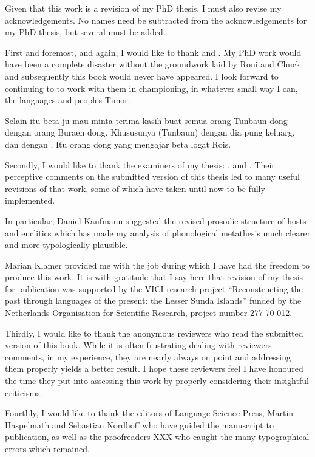 \begin{refsection}

Given that this work is a revision of my PhD thesis,
I must also revise my acknowledgements.
No names need be subtracted from the acknowledgements for my PhD thesis,
but several must be added.

First and foremost, and again, I would like to thank
 and .
My PhD work would have been a complete disaster without
the groundwork laid by Roni and Chuck and subsequently this book would never have appeared.
I look forward to continuing to to work with them in championing,
in whatever small way I can, the languages and peoples Timor.

Selain itu beta ju mau minta terima kasih buat semua
orang Tunbaun dong dengan orang Buraen dong.
Khususunya  (Tunbaun) dengan dia pung keluarg,
dan  dengan .
Itu orang dong yang mengajar beta logat Ro{\Q}is.

Secondly, I would like to thank the examiners of my thesis:
,  and .
Their perceptive comments on the submitted version of this thesis
led to many useful revisions of that work, some of which have
taken until now to be fully implemented.

In particular, Daniel Kaufmann suggested
the revised prosodic structure of hosts and enclitics which
has made my analysis of phonological metathesis much clearer
and more typologically plausible.

Marian Klamer provided me with the job during
which I have had the freedom to produce this work.
It is with gratitude that I say here that
revision of my thesis for publication was supported
by the VICI research project ``Reconstructing the past
through languages of the present: the Lesser Sunda Islands''
funded by the Netherlands Organisation for Scientific
Research, project number 277-70-012.

Thirdly, I would like to thank the anonymous reviewers
who read the submitted version of this book.
While it is often frustrating dealing with reviewers comments,
in my experience, they are nearly always on point and 
addressing them properly yields a better result.
I hope these reviewers feel I have honoured the time
they put into assessing this work by properly
considering their insightful criticisms.

Fourthly, I would like to thank the editors of Language
Science Press, Martin Haspelmath and Sebastian Nordhoff
who have guided the manuscript to publication,
as well as the proofreaders XXX who caught the many
typographical errors which remained.


\end{refsection}
